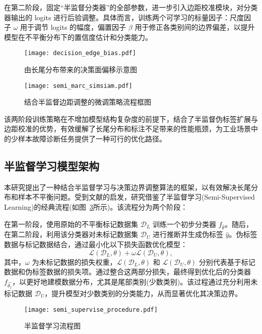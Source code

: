 \documentclass[master]{thesis-uestc}
\begin{document}
在第二阶段，固定“半监督分类器”的全部参数，进一步引入边距校准模块，对分类器输出的 logits 进行后验调整。具体而言，训练两个可学习的标量因子：尺度因子 $\omega$ 用于调节 logits 的幅度，偏置因子 $\beta$ 用于修正各类别间的边界偏差，以提升模型在不平衡分布下的置信度估计和分类能力。

\begin{figure}[H]
    \centering
    \texttt{[image: decision\_edge\_bias.pdf]}
    \caption{由长尾分布带来的决策面偏移示意图}
    \label{decision_edge_bias}
\end{figure}

\begin{figure}[H]
    \centering
    \texttt{[image: semi\_marc\_simsiam.pdf]}
    \caption{结合半监督边距调整的微调策略流程框图}
    \label{semi_marc_simsiam}
\end{figure}

该两阶段训练策略在不增加模型结构复杂度的前提下，结合了半监督伪标签扩展与边距校准的优势，有效缓解了长尾分布和标注不足带来的性能瓶颈，为工业场景中的少样本故障诊断任务提供了一种可行的优化路径。

\subsection{半监督学习模型架构}
本研究提出了一种结合半监督学习与决策边界调整算法的框架，以有效解决长尾分布和样本不平衡问题。受到文献\cite{yang2020rethinking,wang2023margin}的启发，研究借鉴了半监督学习(Semi-Supervised Learning)的经典流程(如图~\ref{semi_supervise_procedure}所示)。该流程分为两个阶段：

在第一阶段，使用原始的不平衡标记数据集 $\mathcal{D}_{L}$ 训练一个初步分类器 $f_{\hat{\theta}}$。随后，在第二阶段，利用该分类器对未标记数据集 $\mathcal{D}_{U}$ 进行推断并生成伪标签 $\hat{y}$。伪标签数据与标记数据结合，通过最小化以下损失函数优化模型：
\begin{equation} 
    \mathcal{L}(\mathcal{D}_{L},\theta) + \omega \mathcal{L}(\mathcal{D}_{U},\theta), 
    \label{eq:semi_loss}
\end{equation}
其中，$\omega$ 为未标记数据的损失权重，$\mathcal{L}(\mathcal{D}_{L},\theta)$ 和 $\mathcal{L}(\mathcal{D}_{U},\theta)$ 分别代表基于标记数据和伪标签数据的损失项。通过整合这两部分损失，最终得到优化后的分类器 $f_{\hat{\theta_f}}$，以更好地建模数据分布，尤其是尾部类别(少数类别)。该过程通过充分利用未标记数据 $\mathcal{D}_{U}$，提升模型对少数类别的分类能力，从而显著优化其决策边界。

\begin{figure}[h]
    \centering
    \texttt{[image: semi\_supervise\_procedure.pdf]}
    \caption{半监督学习流程图}
    \label{semi_supervise_procedure}
\end{figure}
\end{document}
